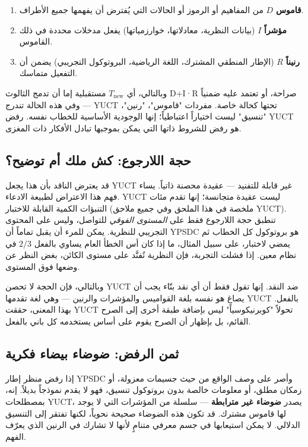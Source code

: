 \documentclass[12pt,a4paper]{article}
\begin{document}
	\begin{enumerate}
		\item \textbf{قاموس} \(D\) من المفاهيم أو الرموز أو الحالات التي يُفترض أن يفهمها جميع الأطراف.
		\item \textbf{مؤشراً} \(I\) (بيانات النظرية، معادلاتها، خوارزمياتها) يفعل مدخلات محددة في ذلك القاموس.
		\item \textbf{رنيناً} \(R\) (الإطار المنطقي المشترك، اللغة الرياضية، البروتوكول التجريبي) يضمن أن التفعيل متماسك.
	\end{enumerate}
	
	وبالتالي، أي \(T_{\text{new}}\) مستقبلية إما أن تدمج الثالوث D+I·R صراحة، أو تعتمد عليه ضمنياً — وفي هذه الحالة تندرج YUCT تحتها كحالة خاصة. مفردات "قاموس"، "رنين"، "تنسيق" ليست اختياراً اعتباطياً؛ إنها الوجودية الأساسية للخطاب نفسه. رفض YUCT هو رفض للشروط ذاتها التي يمكن بموجبها تبادل الأفكار ذات المغزى.
	
	\subsection{حجة اللارجوع: كش ملك أم توضيح؟}
	
	قد يعترض الناقد بأن هذا يجعل YUCT غير قابلة للتفنيد — عقيدة محصنة ذاتياً. يساء فهم هذا الاعتراض لطبيعة الادعاء. YUCT ليست عقيدة متجانسة؛ إنها تقدم مئات التنبؤات الكمية القابلة للاختبار (ملخصة في هذا الملحق وفي جميع ملاحق YUCT). تنطبق حجة اللارجوع فقط على \emph{المستوى الفوقي} للتواصل، وليس على المحتوى التجريبي للنظرية. يمكن للمرء أن يقبل تماماً أن YPSDC هو بروتوكول كل الخطاب ثم يمضي لاختبار، على سبيل المثال، ما إذا كان أس الخطأ العام يساوي بالفعل \(2/3\) في نظام معين. إذا فشلت التجربة، فإن النظرية تُفنَّد على مستوى الكائن، بغض النظر عن وضعها فوق المستوى.
	
	وبالتالي، فإن الحجة لا تحصن YUCT ضد النقد. إنها تقول فقط أن أي نقد بنّاء يجب أن يصاغ هو نفسه بلغة القواميس والمؤشرات والرنين — وهي لغة تقدمها YUCT بالفعل. بهذا المعنى، حققت YUCT تحولاً "كوبرنيكوسياً" ليس بإضافة طبقة أخرى إلى الصرح القائم، بل بإظهار أن الصرح يقوم على أساس يستخدمه كل باني بالفعل.
	
	\subsection{ثمن الرفض: ضوضاء بيضاء فكرية}
	
	إذا رفض منظر إطار YPSDC وأصر على وصف الواقع من حيث جسيمات معزولة، أو زمكان مطلق، أو معلومات خالصة بدون بروتوكول تنسيق، فهو لا يقدم نموذجاً بديلاً. إنه، بمصطلحات YUCT، يصدر \textbf{ضوضاء غير مترابطة} — سلسلة من المؤشرات التي لا يوجد لها قاموس مشترك. قد تكون هذه الضوضاء صحيحة نحوياً، لكنها تفتقر إلى التنسيق الدلالي. لا يمكن استيعابها في جسم معرفي متنامٍ لأنها لا تشارك في الرنين الذي يعرّف الفهم.
	
\end{document}
